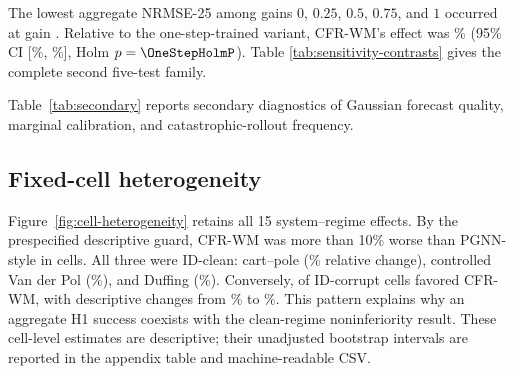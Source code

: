 \begin{table}[t]
\centering
\caption{CFR-WM relative NRMSE-25 effects against broad comparators. Exact
$p$ values test a zero seed-level difference; Holm adjustment is confined to
this prespecified family of five.}
\label{tab:comparator-contrasts}

\end{table}

The lowest aggregate NRMSE-25 among gains $0$, $0.25$, $0.5$, $0.75$, and $1$
occurred at gain \BestGain. Relative to the one-step-trained variant, CFR-WM's
effect was \OneStepImprovement\% (95\% CI [\OneStepRelativeCILow\%,
\OneStepRelativeCIHigh\%], Holm $p=\OneStepHolmP$). Table
\ref{tab:sensitivity-contrasts} gives the complete second five-test family.

\begin{table}[t]
\centering
\caption{CFR-WM relative NRMSE-25 effects against gain and training-horizon
sensitivities. Positive values favor the proposed gain-0.5 multi-step model.}
\label{tab:sensitivity-contrasts}

\end{table}

Table~\ref{tab:secondary} reports secondary diagnostics of Gaussian forecast
quality, marginal calibration, and catastrophic-rollout frequency.

\begin{table}[t]
\centering
\caption{Secondary aggregate diagnostics for the six broad methods. Rates and
scores are seed-balanced over all fixed cells and are not separately tested.}
\label{tab:secondary}
\resizebox{\textwidth}{!}{}
\end{table}

\subsection{Fixed-cell heterogeneity}

Figure~\ref{fig:cell-heterogeneity} retains all 15 system--regime effects. By
the prespecified descriptive guard, CFR-WM was more than 10\% worse than PGNN-style in
\CellsWorseTen{} cells. All three were ID-clean: cart--pole
(\CartpoleCleanChange\% relative change), controlled Van der Pol
(\VanDerPolCleanChange\%), and Duffing (\DuffingCleanChange\%). Conversely,
\IDCorruptFavoredCount{} of \IDCorruptCellCount{} ID-corrupt cells favored
CFR-WM, with descriptive changes from \IDCorruptLeastChange\% to
\IDCorruptMostChange\%. This pattern explains why an aggregate H1 success coexists with
the clean-regime noninferiority result. These cell-level estimates are
descriptive; their unadjusted bootstrap intervals are reported in the appendix
table and machine-readable CSV.

